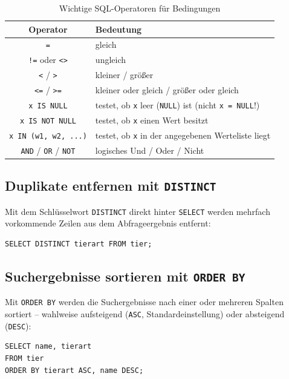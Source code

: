 \begin{table}[h]
\centering
\begin{tabular}{|c|l|}
\hline
\textbf{Operator} & \textbf{Bedeutung}\\ \hline
\texttt{=} & gleich \\ \hline
\texttt{!=} oder \texttt{<>} & ungleich \\ \hline
\texttt{<} / \texttt{>} & kleiner / größer \\ \hline
\texttt{<=} / \texttt{>=} & kleiner oder gleich / größer oder gleich \\ \hline
\texttt{x IS NULL} & testet, ob \texttt{x} leer (\texttt{NULL}) ist (nicht \texttt{x = NULL}!) \\ \hline
\texttt{x IS NOT NULL} & testet, ob \texttt{x} einen Wert besitzt \\ \hline
\texttt{x IN (w1, w2, ...)} & testet, ob \texttt{x} in der angegebenen Werteliste liegt \\ \hline
\texttt{AND} / \texttt{OR} / \texttt{NOT} & logisches Und / Oder / Nicht \\ \hline
\end{tabular}
\caption{Wichtige SQL-Operatoren für Bedingungen}
\label{tab:sql-vergleichsoperatoren}
\end{table}

\subsection{Duplikate entfernen mit \texttt{DISTINCT}}

Mit dem Schlüsselwort \lstinline|DISTINCT| direkt hinter \lstinline|SELECT|
werden mehrfach vorkommende Zeilen aus dem Abfrageergebnis entfernt:

\begin{lstlisting}
SELECT DISTINCT tierart FROM tier;
\end{lstlisting}

\subsection{Suchergebnisse sortieren mit \texttt{ORDER BY}}

Mit \lstinline|ORDER BY| werden die Suchergebnisse nach einer oder mehreren
Spalten sortiert -- wahlweise aufsteigend (\lstinline|ASC|, Standardeinstellung)
oder absteigend (\lstinline|DESC|):

\begin{lstlisting}
SELECT name, tierart
FROM tier
ORDER BY tierart ASC, name DESC;
\end{lstlisting}

